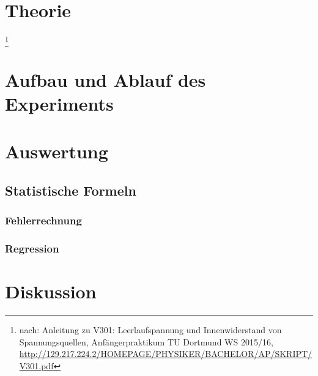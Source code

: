 \documentclass[a4,12pt]{article}
\begin{document}



\tableofcontents
\newpage


\section{Theorie}
\footnote{nach: Anleitung zu V301: Leerlaufspannung und Innenwiderstand von Spannungsquellen, Anfängerpraktikum TU Dortmund WS 2015/16, \url{http://129.217.224.2/HOMEPAGE/PHYSIKER/BACHELOR/AP/SKRIPT/V301.pdf}}

\newpage


\section{Aufbau und Ablauf des Experiments}

\clearpage


\section{Auswertung}
\subsection{Statistische Formeln}
\subsubsection{Fehlerrechnung}
\label{sec:Fehlerrechnung}

\subsubsection{Regression}
\label{sec:regression}


\newpage


\section{Diskussion}

\end{document}
